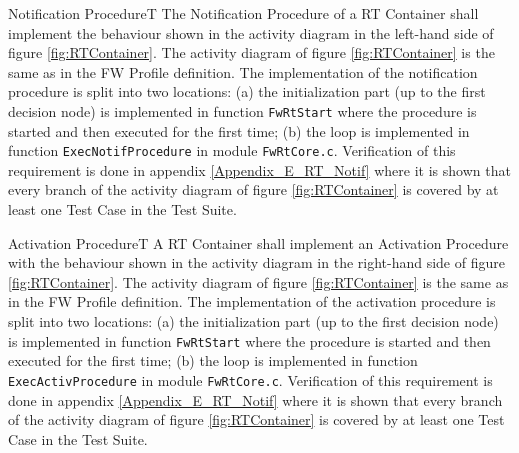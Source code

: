 \documentclass[a4paper,10pt]{article}
\newenvironment{fw_req}[6]
{\addtocounter{subsubsection}{1}
	\hspace{0.2cm}\textbf{FW-\arabic{section}.\arabic{subsection}.\arabic{subsubsection}/#2
	\hspace{0.8cm} #1}
	\vspace{-10pt}
\begin{longtable}{p{2.7cm}P{8.5cm}}
\hline
\textsc{Requirement} & #3 \\
\textsc{Justification} & #4 \\
\textsc{Implementation} & #5  \\ 
\textsc{Verification} & #6  \\
\hline
}
{\end{longtable}}
\begin{document}
\begin{fw_req}{Notification Procedure}{T}
{The Notification Procedure of a RT Container shall implement the behaviour shown in the activity diagram in the left-hand side of figure \ref{fig:RTContainer}.}
{The activity diagram of figure \ref{fig:RTContainer} is the same as in the FW Profile definition.}
{The implementation of the notification procedure is split into two locations: (a) the initialization part (up to the first decision node) is implemented in function \texttt{FwRtStart} where the procedure is started and then executed for the first time; (b) the loop is implemented in function \texttt{ExecNotifProcedure} in module \texttt{FwRtCore.c}.} 
{Verification of this requirement is done in appendix \ref{Appendix_E_RT_Notif} where it is shown that every branch of the activity diagram of figure \ref{fig:RTContainer} is covered by at least one Test Case in the Test Suite.}
\end{fw_req}

\begin{fw_req}{Activation Procedure}{T}
{A RT Container shall implement an Activation Procedure with the behaviour shown in the activity diagram in the right-hand side of figure \ref{fig:RTContainer}.}
{The activity diagram of figure \ref{fig:RTContainer} is the same as in the FW Profile definition.}
{The implementation of the activation procedure is split into two locations: (a) the initialization part (up to the first decision node) is implemented in function \texttt{FwRtStart} where the procedure is started and then executed for the first time; (b) the loop is implemented in function \texttt{ExecActivProcedure} in module \texttt{FwRtCore.c}.} 
{Verification of this requirement is done in appendix \ref{Appendix_E_RT_Notif} where it is shown that every branch of the activity diagram of figure \ref{fig:RTContainer} is covered by at least one Test Case in the Test Suite.}
\end{fw_req}
\end{document}
